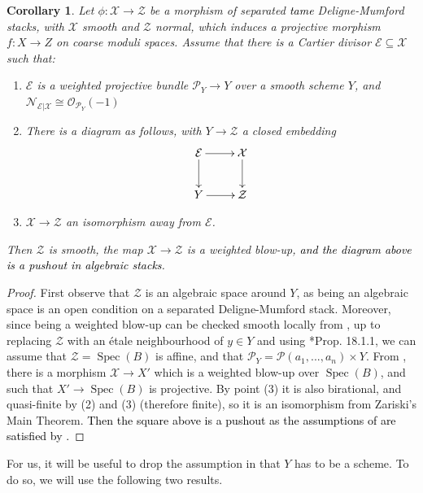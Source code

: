 \documentclass{amsart}
\newcommand{\cE}{\mathcal{E}}
\newcommand{\cN}{\mathcal{N}}
\newcommand{\cO}{\mathcal{O}}
\newcommand{\cP}{\mathcal{P}}
\newcommand{\cX}{\mathcal{X}}
\newcommand{\cZ}{\mathcal{Z}}
\newcommand{\spec}{\operatorname{Spec}}
\newtheorem{Cor}[theorem]{Corollary}
\theoremstyle{definition}
\begin{document}
 
\begin{Cor}\label{cor_contraction_is_wblowup}
    Let $\phi:\cX\to \cZ$ be a morphism of separated \textcolor{black}{tame} Deligne-Mumford stacks, with $\cX$ smooth and $\cZ$ normal, which induces a projective morphism $f:X\to Z$ on coarse moduli spaces. Assume that there is a Cartier divisor $\cE\subseteq \cX$ such that:
    \begin{enumerate}
        \item $\cE$ is a weighted projective bundle $\cP_{Y}\to {Y}$ over a smooth scheme ${Y}$, and $\cN_{\cE\vert\cX}\cong \cO_{\cP_{Y}}(-1)$
        \item There is a diagram as follows, with $Y\to \cZ$ a closed embedding
        $$\xymatrix{\cE\ar[d] \ar[r] & \cX \ar[d] \\ {Y}\ar[r] & \cZ}$$
        \item $\cX\to \cZ$ an isomorphism away from $\cE$.
    \end{enumerate}
    Then $\cZ$ is smooth, the map $\cX\to \cZ$ is a weighted blow-up, \textcolor{black}{and the diagram above is a pushout in algebraic stacks}. 
\end{Cor}
\begin{proof}

    First observe that $\cZ$ is an algebraic space around ${Y}$, as being an algebraic space is an open condition on a separated Deligne-Mumford stack. Moreover, since being a weighted blow-up can be checked smooth locally from , up to replacing $\cZ$ with an \'etale neighbourhood of $y\in Y$ and using \cite{EGAIV}*{Prop. 18.1.1}, we can assume that $\cZ=\spec(B)$ is affine, and that $\cP_{Y}=\cP(a_1,...,a_n)\times {Y}$. From , there is a morphism $\cX\to X'$ which is a weighted blow-up over $\spec(B)$, and such that $X'\to \spec(B)$ is projective. By point (3) it is also birational, and quasi-finite by (2) and (3) (therefore finite), so it is an isomorphism from Zariski's Main Theorem. \textcolor{black}{Then the square above is a pushout as the assumptions of  are satisfied by .}
\end{proof}

For us, it will be useful to drop the assumption in  that $Y$ has to be a scheme. To do so, we will use the following two results.
\end{document}
